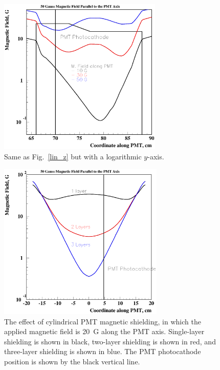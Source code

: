 \begin{figure}
\hspace{0.5cm}
\begin{centering}
\includegraphics[height=7.5cm]{Magnetic-shielding/shield_z_log.eps}
\vspace{0.5cm}
\caption{\small{Same as Fig.~\ref{lin_z} but with a logarithmic $y$-axis.}}
\label{log_z}
\end{centering}
\end{figure}

\begin{figure}
\hspace{0.5cm}
\begin{centering}
\includegraphics[height=7.5cm]{Magnetic-shielding/3layers.eps}
\vspace{0.5cm}
\caption{\small{The effect of cylindrical PMT magnetic shielding, in which
the applied magnetic field is 20~G along the PMT axis. Single-layer shielding 
is shown in black, two-layer shielding is shown in red, and three-layer
shielding is shown in blue.  The PMT photocathode position is shown by 
the black vertical line.}}
\label{3layers}
\end{centering}
\end{figure}


